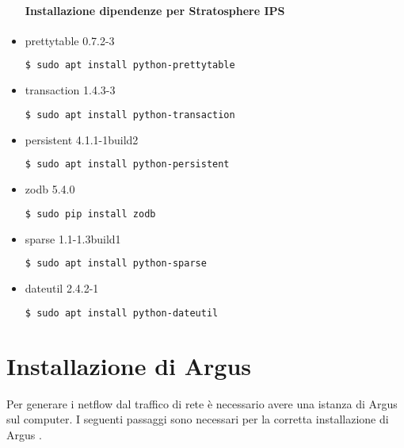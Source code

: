 \documentclass[../main.tex]{subfiles}
\begin{document}
\begin{itemize}
				\paragraph{Installazione dipendenze per Stratosphere IPS}

				\item prettytable 0.7.2-3
\begin{lstlisting}[language=bash]
$ sudo apt install python-prettytable
\end{lstlisting}

				\item transaction 1.4.3-3
\begin{lstlisting}[language=bash]
$ sudo apt install python-transaction
\end{lstlisting}

				\item persistent 4.1.1-1build2
\begin{lstlisting}[language=bash]
$ sudo apt install python-persistent
\end{lstlisting}

				\item zodb 5.4.0
\begin{lstlisting}[language=bash]
$ sudo pip install zodb
\end{lstlisting}

				\item sparse 1.1-1.3build1
\begin{lstlisting}[language=bash]
$ sudo apt install python-sparse
\end{lstlisting}

				\item dateutil 2.4.2-1
\begin{lstlisting}[language=bash]
$ sudo apt install python-dateutil
\end{lstlisting}


\end{itemize}

\section{Installazione di Argus}

Per generare i netflow dal traffico di rete è necessario avere una istanza di Argus sul computer. I seguenti passaggi sono necessari per la corretta installazione di Argus \cite{stf}.
\end{document}
